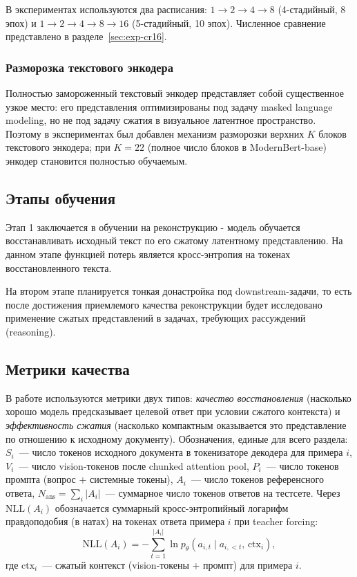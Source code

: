 \documentclass[a4paper,12pt]{extarticle}
\begin{document}
В экспериментах используются два расписания: $1 \to 2 \to 4 \to 8$ (4-стадийный, 8 эпох) и $1 \to 2 \to 4 \to 8 \to 16$ (5-стадийный, 10 эпох). Численное сравнение представлено в разделе~\ref{sec:exp-cr16}.

\subsubsection{Разморозка текстового энкодера}\label{sec:method-unfreeze}

Полностью замороженный текстовый энкодер представляет собой существенное узкое место: его представления оптимизированы под задачу masked language modeling, но не под задачу сжатия в визуальное латентное пространство. Поэтому в экспериментах был добавлен механизм разморозки верхних $K$ блоков текстового энкодера; при $K = 22$ (полное число блоков в ModernBert-base) энкодер становится полностью обучаемым.

\subsection{Этапы обучения}

Этап 1 заключается в обучении на реконструкцию - модель обучается восстанавливать исходный текст по его сжатому латентному представлению. На данном этапе функцией потерь является кросс-энтропия на токенах восстановленного текста.

На втором этапе планируется тонкая донастройка под downstream-задачи, то есть после достижения приемлемого качества реконструкции будет исследовано применение сжатых представлений в задачах, требующих рассуждений (reasoning).

\subsection{Метрики качества}\label{sec:metrics}

В работе используются метрики двух типов: \emph{качество восстановления} (насколько хорошо модель предсказывает целевой ответ при условии сжатого контекста) и \emph{эффективность сжатия} (насколько компактным оказывается это представление по отношению к исходному документу). Обозначения, единые для всего раздела: $S_i$~--- число токенов исходного документа в токенизаторе декодера для примера $i$, $V_i$~--- число vision-токенов после chunked attention pool, $P_i$~--- число токенов промпта (вопрос + системные токены), $A_i$~--- число токенов референсного ответа, $N_{\text{ans}} = \sum_i |A_i|$~--- суммарное число токенов ответов на тестсете. Через $\mathrm{NLL}(A_i)$ обозначается суммарный кросс-энтропийный логарифм правдоподобия (в натах) на токенах ответа примера $i$ при teacher forcing:
\begin{equation}
\label{eq:nll}
    \mathrm{NLL}(A_i) = -\sum_{t=1}^{|A_i|} \ln p_\theta\!\left(a_{i,t} \mid a_{i,<t},\, \text{ctx}_i\right),
\end{equation}
где $\text{ctx}_i$~--- сжатый контекст (vision-токены + промпт) для примера $i$.
\end{document}
